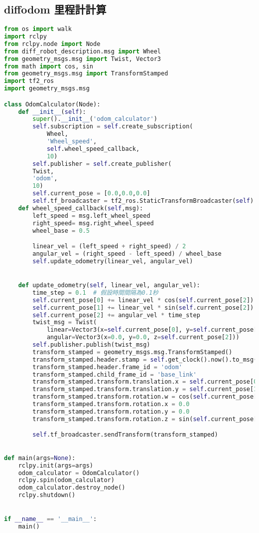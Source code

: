 \subsection{diffodom 里程計計算}
\begin{lstlisting}[language=Python, caption=control node]
from os import walk
import rclpy
from rclpy.node import Node
from diff_robot_description.msg import Wheel
from geometry_msgs.msg import Twist, Vector3
from math import cos, sin
from geometry_msgs.msg import TransformStamped
import tf2_ros
import geometry_msgs.msg

class OdomCalculator(Node):
    def __init__(self):
        super().__init__('odom_calculator')
        self.subscription = self.create_subscription(
            Wheel,
            'Wheel_speed',
            self.wheel_speed_callback,
            10)
        self.publisher = self.create_publisher(
        Twist,
        'odom',
        10)
        self.current_pose = [0.0,0.0,0.0]
        self.tf_broadcaster = tf2_ros.StaticTransformBroadcaster(self)
    def wheel_speed_callback(self,msg):
        left_speed = msg.left_wheel_speed
        right_speed= msg.right_wheel_speed
        wheel_base = 0.5

        linear_vel = (left_speed + right_speed) / 2
        angular_vel = (right_speed - left_speed) / wheel_base
        self.update_odometry(linear_vel, angular_vel)


    def update_odometry(self, linear_vel, angular_vel):
        time_step = 0.1  # 假設時間間隔為0.1秒
        self.current_pose[0] += linear_vel * cos(self.current_pose[2]) * time_step
        self.current_pose[1] += linear_vel * sin(self.current_pose[2]) * time_step
        self.current_pose[2] += angular_vel * time_step
        twist_msg = Twist(
            linear=Vector3(x=self.current_pose[0], y=self.current_pose[1], z=0.0),
            angular=Vector3(x=0.0, y=0.0, z=self.current_pose[2]))
        self.publisher.publish(twist_msg)
        transform_stamped = geometry_msgs.msg.TransformStamped()
        transform_stamped.header.stamp = self.get_clock().now().to_msg()
        transform_stamped.header.frame_id = 'odom'
        transform_stamped.child_frame_id = 'base_link'
        transform_stamped.transform.translation.x = self.current_pose[0]
        transform_stamped.transform.translation.y = self.current_pose[1]
        transform_stamped.transform.rotation.w = cos(self.current_pose[2] / 2)
        transform_stamped.transform.rotation.x = 0.0
        transform_stamped.transform.rotation.y = 0.0
        transform_stamped.transform.rotation.z = sin(self.current_pose[2] / 2)

        self.tf_broadcaster.sendTransform(transform_stamped)
      

def main(args=None):
    rclpy.init(args=args)
    odom_calculator = OdomCalculator()
    rclpy.spin(odom_calculator)
    odom_calculator.destroy_node()
    rclpy.shutdown()


if __name__ == '__main__':
    main()

\end{lstlisting}

